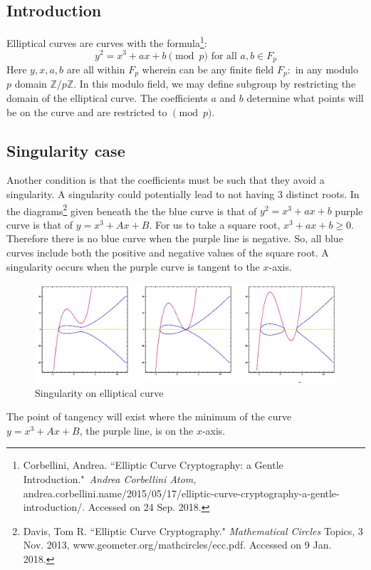 \documentclass[a4paper,12pt]{article}
\theoremstyle{definition}
\begin{document}
\subsection{Introduction} \label{eccintro} 
Elliptical curves are curves with the formula\footnote{Corbellini, Andrea. ``Elliptic Curve Cryptography: a Gentle Introduction." \textit{Andrea Corbellini Atom,} andrea.corbellini.name/2015/05/17/elliptic-curve-cryptography-a-gentle-introduction/. Accessed on 24 Sep. 2018.}:
\begin{equation} \label{ellipticalcurve}
	y^2 =x^3 + ax + b  \pmod p \text{ for all } a,b \in F_p 
\end{equation}
Here $y,x,a,b$ are all within $F_p$ wherein can be any finite field $F_p:$ in any modulo $p$ domain $\mathbb{Z}/p\mathbb{Z}$. In this modulo field, we may define subgroup by restricting the domain of the elliptical curve. The coefficients $a$ and $b$ determine what points will be on the curve and are restricted to $\pmod p$. 


\subsection{Singularity case}
Another condition is that the coefficients must be such that they avoid a singularity. A singularity could potentially lead to not having 3 distinct roots. In the diagrams\footnote{Davis, Tom R. ``Elliptic Curve Cryptography." \textit{Mathematical Circles} Topics, 3 Nov. 2013, www.geometer.org/mathcircles/ecc.pdf. Accessed on 9 Jan. 2018.} given beneath the  the blue curve is that of $y^2 =x^3 +ax +b$ purple curve is that of $y=x^3 + Ax +B$. For us to take a square root, $x^3+ax+b \geq 0$. Therefore there is no blue curve when the purple line is negative. So, all blue curves include both the positive and negative values of the square root. A singularity occurs when the purple curve is tangent to the $x$-axis.
\begin{figure}[H]
	 \centering
     \includegraphics[width=\textwidth]{singularity}
     \caption{Singularity on elliptical curve}
     \label{}	
\end{figure}
The point of tangency will exist where the minimum of the curve $y=x^3 + Ax +B$, the purple line, is on the $x$-axis. 
\end{document}
